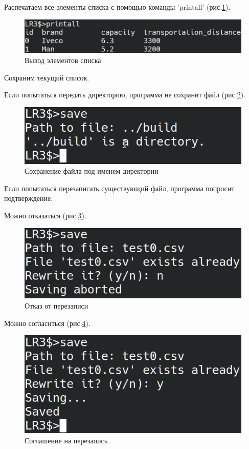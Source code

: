 Распечатаем все элементы списка с помощью команды 'printall' (рис.\ref{test.printall}).

\begin{figure}[hpt!]
    \centering
    \includegraphics[width=0.9\linewidth]{photo/test.printall}
    \caption{Вывод элементов списка}
    \label{test.printall}
\end{figure}

Сохраним текущий список.

Если попытаться передать директорию, программа не сохранит файл (рис.\ref{test.save.dir}).

\begin{figure}[hpt!]
    \centering
    \includegraphics[width=0.9\linewidth]{photo/test.save.dir}
    \caption{Сохранение файла под именем директории}
    \label{test.save.dir}
\end{figure}

Если попытаться перезаписать существующий файл, программа попросит подтверждение.

Можно отказаться (рис.\ref{test.save.n}).

\begin{figure}[hpt!]
    \centering
    \includegraphics[width=0.9\linewidth]{photo/test.save.n}
    \caption{Отказ от перезаписи}
    \label{test.save.n}
\end{figure}

Можно согласиться (рис.\ref{test.save.y}).

\begin{figure}[hpt!]
    \centering
    \includegraphics[width=0.9\linewidth]{photo/test.save.y}
    \caption{Соглашение на перезапись}
    \label{test.save.y}
\end{figure}

